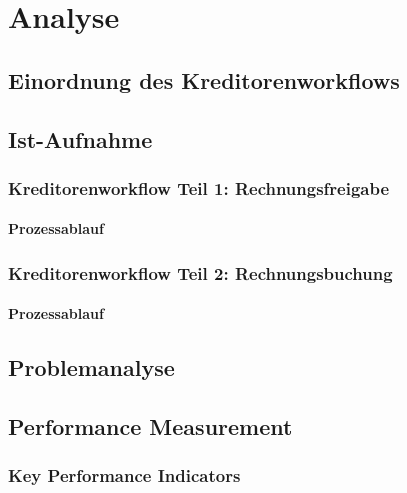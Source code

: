 \chapter{Analyse}

\section{Einordnung des Kreditorenworkflows}

\section{Ist-Aufnahme}

\subsection{Kreditorenworkflow Teil 1: Rechnungsfreigabe}

\subsubsection{Prozessablauf}



\subsection{Kreditorenworkflow Teil 2: Rechnungsbuchung}

\subsubsection{Prozessablauf}





\section{Problemanalyse}

\section{Performance Measurement}
\subsection{Key Performance Indicators}